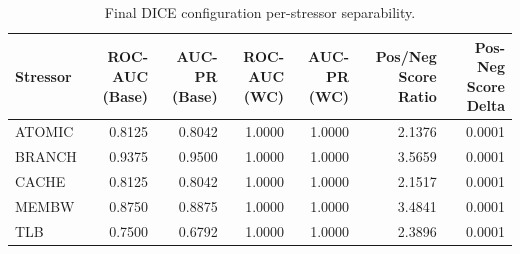\begin{table}[t]
\centering
\caption{Final DICE configuration per-stressor separability.}
\label{tab:dice_full_stressor}
\footnotesize
\begin{tabular}{lrrrrrr}
\toprule
Stressor & ROC-AUC (Base) & AUC-PR (Base) & ROC-AUC (WC) & AUC-PR (WC) & Pos/Neg Score Ratio & Pos-Neg Score Delta \\
\midrule
ATOMIC & 0.8125 & 0.8042 & 1.0000 & 1.0000 & 2.1376 & 0.0001 \\
BRANCH & 0.9375 & 0.9500 & 1.0000 & 1.0000 & 3.5659 & 0.0001 \\
CACHE & 0.8125 & 0.8042 & 1.0000 & 1.0000 & 2.1517 & 0.0001 \\
MEMBW & 0.8750 & 0.8875 & 1.0000 & 1.0000 & 3.4841 & 0.0001 \\
TLB & 0.7500 & 0.6792 & 1.0000 & 1.0000 & 2.3896 & 0.0001 \\
\bottomrule
\end{tabular}

\end{table}
